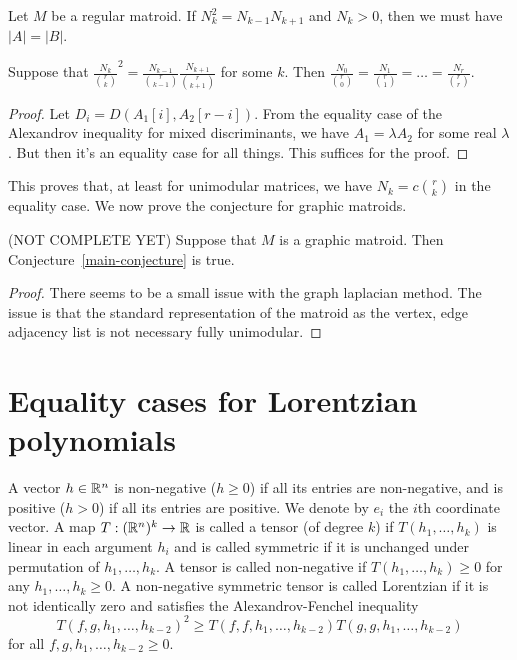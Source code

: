 \documentclass[12pt]{article}
\begin{document}
\begin{prop}
	Let $M$ be a regular matroid. If $N_k^2 = N_{k-1} N_{k+1}$ and $N_k > 0$, then we must have $|A| = |B|$. 
\end{prop}

\begin{thm}
	Suppose that $\frac{N_k}{\binom{r}{k}}^2 = \frac{N_{k-1}}{\binom{r}{k-1}} \frac{N_{k+1}}{\binom{r}{k+1}}$ for some $k$. Then $\frac{N_0}{\binom{r}{0}} = \frac{N_1}{\binom{r}{1}} = \ldots = \frac{N_r}{\binom{r}{r}}$. 
\end{thm}

\begin{proof}
	Let $D_i = D(A_1[i], A_2 [r-i])$. From the equality case of the Alexandrov inequality for mixed discriminants, we have $A_1 = \lambda A_2$ for some real $\lambda$. But then it's an equality case for all things. This suffices for the proof. 
\end{proof}

This proves that, at least for unimodular matrices, we have $N_k = c \binom{r}{k}$ in the equality case. We now prove the conjecture for graphic matroids. 

\begin{thm}
	(NOT COMPLETE YET) Suppose that $M$ is a graphic matroid. Then Conjecture~\ref{main-conjecture} is true.
\end{thm}
\begin{proof}
	There seems to be a small issue with the graph laplacian method. The issue is that the standard representation of the matroid as the vertex, edge adjacency list is not necessary fully unimodular. 
\end{proof}

\section{Equality cases for Lorentzian polynomials}

A vector $h \in \mathbb{R}^n$ is non-negative ($h \geq 0$) if all its entries are non-negative, and is positive ($h > 0$) if all its entries are positive. We denote by $e_i$ the $i$th coordinate vector. A map $T : (\mathbb{R}^n)^k \to \mathbb{R}$ is called a tensor (of degree $k$) if $T(h_1, \ldots, h_k)$ is linear in each argument $h_i$ and is called symmetric if it is unchanged under permutation of $h_1, \ldots, h_k$. A tensor is called non-negative if $T(h_1, \ldots, h_k) \geq 0$ for any $h_1, \ldots, h_k \geq 0$. A non-negative symmetric tensor is called Lorentzian if it is not identically zero and satisfies the Alexandrov-Fenchel inequality 
\[
	T(f, g, h_1, \ldots, h_{k-2})^2 \geq T(f, f, h_1, \ldots, h_{k-2}) T(g, g, h_1, \ldots, h_{k-2})
\]
for all $f, g, h_1, \ldots, h_{k-2} \geq 0$. 
\end{document}
